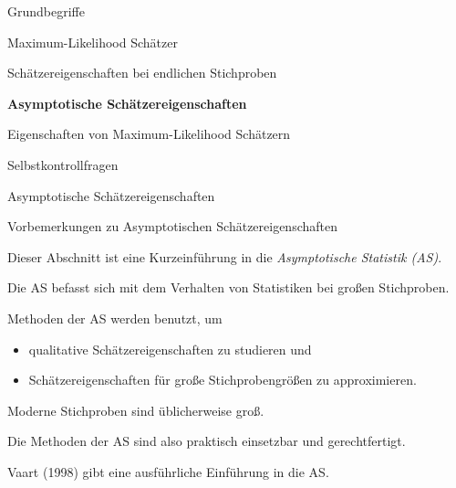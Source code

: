 \documentclass[
  8pt,
  ignorenonframetext,
]{beamer}
\providecommand{\tightlist}{%
  \setlength{\itemsep}{0pt}\setlength{\parskip}{0pt}}
\begin{document}
\begin{frame}{}
\protect\hypertarget{section-10}{}
\large
\vfill
{}

Grundbegriffe

Maximum-Likelihood Schätzer

Schätzereigenschaften bei endlichen Stichproben

\textbf{Asymptotische Schätzereigenschaften}

Eigenschaften von Maximum-Likelihood Schätzern

Selbstkontrollfragen \vfill
\end{frame}

\begin{frame}{Asymptotische Schätzereigenschaften}
\protect\hypertarget{asymptotische-schuxe4tzereigenschaften}{}

Vorbemerkungen zu Asymptotischen Schätzereigenschaften \small

Dieser Abschnitt ist eine Kurzeinführung in die
\textit{Asymptotische Statistik (AS)}.

Die AS befasst sich mit dem Verhalten von Statistiken bei großen
Stichproben.

Methoden der AS werden benutzt, um

\begin{itemize}
\tightlist
\item
  qualitative Schätzereigenschaften zu studieren und
\item
  Schätzereigenschaften für große Stichprobengrößen zu approximieren.
\end{itemize}

Moderne Stichproben sind üblicherweise groß.

Die Methoden der AS sind also praktisch einsetzbar und gerechtfertigt.

Vaart (1998) gibt eine ausführliche Einführung in die AS.
\end{frame}
\end{document}
